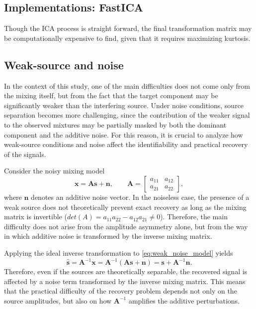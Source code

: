 \subsection{Implementations: FastICA}

Though the ICA process is straight forward, the final transformation matrix may be computationally expensive to find, given that it requires maximizing kurtosis. 

\subsection{Weak-source and noise}
In the context of this study, one of the main difficulties does not come only from the mixing itself, but from the fact that the target component may be significantly weaker than the interfering source. Under noise conditions, source separation becomes more challenging, since the contribution of the weaker signal to the observed mixtures may be partially masked by both the dominant component and the additive noise. For this reason, it is crucial to analyze how weak-source conditions and noise affect the identifiability and practical recovery of the signals.

Consider the noisy mixing model
\begin{equation}
\mathbf{x}=\mathbf{A}\mathbf{s}+\mathbf{n},
\qquad
\mathbf{A}=
\begin{bmatrix}
a_{11} & a_{12}\\
a_{21} & a_{22}
\end{bmatrix},
\label{eq:weak_noise_model}
\end{equation}
where $\mathbf{n}$ denotes an additive noise vector. In the noiseless case, the presence of a weak source does not theoretically prevent exact recovery as long as the mixing matrix is invertible ($det(A)=a_{11}a_{22}-a_{12}a_{21} \neq0$). Therefore, the main difficulty does not arise from the amplitude asymmetry alone, but from the way in which additive noise is transformed by the inverse mixing matrix.

Applying the ideal inverse transformation to \eqref{eq:weak_noise_model} yields
\begin{equation}
\hat{\mathbf{s}}=\mathbf{A}^{-1}\mathbf{x}
=\mathbf{A}^{-1}(\mathbf{A}\mathbf{s}+\mathbf{n})
=\mathbf{s}+\mathbf{A}^{-1}\mathbf{n}.
\label{eq:inverse_noise_general}
\end{equation}
Therefore, even if the sources are theoretically separable, the recovered signal is affected by a noise term transformed by the inverse mixing matrix. This means that the practical difficulty of the recovery problem depends not only on the source amplitudes, but also on how $\mathbf{A}^{-1}$ amplifies the additive perturbations.

